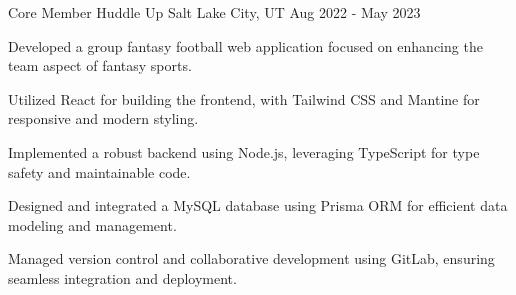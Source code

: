 


\begin{cventries}


\cventry
{Core Member} %
{Huddle Up} %
{Salt Lake City, UT} %
{Aug 2022 - May 2023} %
{ %
\begin{cvitems}
\item {Developed a group fantasy football web application focused on enhancing the team aspect of fantasy sports.}
\item {Utilized React for building the frontend, with Tailwind CSS and Mantine for responsive and modern styling.}
\item {Implemented a robust backend using Node.js, leveraging TypeScript for type safety and maintainable code.}
\item {Designed and integrated a MySQL database using Prisma ORM for efficient data modeling and management.}
\item {Managed version control and collaborative development using GitLab, ensuring seamless integration and deployment.}
\end{cvitems}
}




\end{cventries}